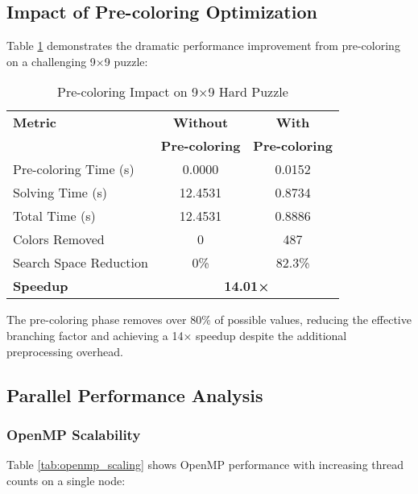 \subsection{Impact of Pre-coloring Optimization}
Table \ref{tab:precolor_impact} demonstrates the dramatic performance improvement from pre-coloring on a challenging 9×9 puzzle:

\begin{table}[htbp]
\caption{Pre-coloring Impact on 9×9 Hard Puzzle}
\begin{center}
\begin{tabular}{@{}lcc@{}}
\toprule
\textbf{Metric} & \textbf{Without} & \textbf{With} \\
& \textbf{Pre-coloring} & \textbf{Pre-coloring} \\
\midrule
Pre-coloring Time (s) & 0.0000 & 0.0152 \\
Solving Time (s) & 12.4531 & 0.8734 \\
Total Time (s) & 12.4531 & 0.8886 \\
Colors Removed & 0 & 487 \\
Search Space Reduction & 0\% & 82.3\% \\
\midrule
\textbf{Speedup} & \multicolumn{2}{c}{\textbf{14.01×}} \\
\bottomrule
\end{tabular}
\end{center}
\label{tab:precolor_impact}
\end{table}

The pre-coloring phase removes over 80\% of possible values, reducing the effective branching factor and achieving a 14× speedup despite the additional preprocessing overhead.

\subsection{Parallel Performance Analysis}

\subsubsection{OpenMP Scalability}
Table \ref{tab:openmp_scaling} shows OpenMP performance with increasing thread counts on a single node:

